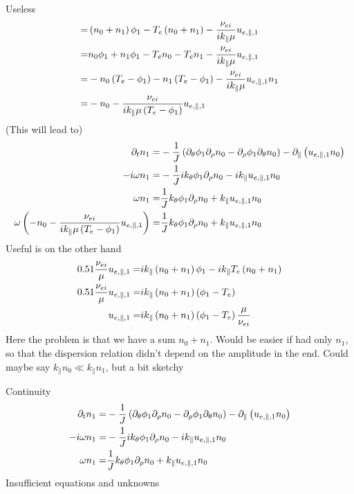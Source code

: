 Useless
%
\begin{align*}
=&
\left( n_0 + n_1\right) \phi_1
- T_e \left( n_0 + n_1 \right)
-  \frac{\nu_{ei}}{ik_\|\mu }  u_{e,\|,1}
  \\
=&
n_0 \phi_1+ n_1 \phi_1
- T_e  n_0 - T_e n_1
-  \frac{\nu_{ei}}{ik_\|\mu }  u_{e,\|,1}
  \\
=&
- n_0 \left(T_e - \phi_1\right)
- n_1 \left(T_e - \phi_1\right)
-  \frac{\nu_{ei}}{ik_\|\mu }  u_{e,\|,1}
  n_1
  \\
=&
- n_0
-  \frac{\nu_{ei}}{ik_\|\mu \left(T_e - \phi_1\right) }  u_{e,\|,1}
\end{align*}
%
(This will lead to)
%
\begin{align*}
 \partial_t n_1
=&
 -\frac{1}{J}\left(
  \partial_\theta\phi_1\partial_\rho n_0
 - \partial_\rho\phi_1\partial_\theta n_0
 \right)
 -  \partial_\| \left(u_{e,\|,1} n_0 \right)
 \\
 -i\omega n_1
=&
 -\frac{1}{J} ik_\theta\phi_1\partial_\rho n_0
 - ik_\|u_{e,\|,1} n_0
 \\
 \omega n_1
=&
 \frac{1}{J} k_\theta\phi_1\partial_\rho n_0
 + k_\|u_{e,\|,1} n_0
 \\
 \omega
 \left(
- n_0
-  \frac{\nu_{ei}}{ik_\|\mu \left(T_e - \phi_1\right) }  u_{e,\|,1}
 \right)
=&
 \frac{1}{J} k_\theta\phi_1\partial_\rho n_0
 + k_\|u_{e,\|,1} n_0
\end{align*}
%
Useful is on the other hand
%
\begin{align*}
    0.51 \frac{\nu_{ei}}{\mu }  u_{e,\|,1}
=&
ik_\|\L( n_0 + n_1\R) \phi_1
- ik_\|T_e \L( n_0 + n_1 \R)
\\
%
    0.51 \frac{\nu_{ei}}{\mu }  u_{e,\|,1}
=&
ik_\|\L( n_0 + n_1\R) \L(\phi_1 -T_e \R)
\\
%
     u_{e,\|,1}
=&
ik_\|\L( n_0 + n_1\R) \L(\phi_1 -T_e \R)
     \frac{\mu}{\nu_{ei} }
\end{align*}
%
Here the problem is that we have a sum $n_0 + n_1$.
Would be easier if had only $n_1$, so that the dispersion relation didn't depend on the amplitude in the end.
Could maybe say $k_\|n_0 \ll k_\|n_1$, but a bit sketchy

Continuity
%
\begin{align*}
 \partial_t n_1
=&
 -\frac{1}{J}\left(
  \partial_\theta\phi_1\partial_\rho n_0
 - \partial_\rho\phi_1\partial_\theta n_0
 \right)
 -  \partial_\| \left(u_{e,\|,1} n_0 \right)
 \\
 -i\omega n_1
=&
 -\frac{1}{J} ik_\theta\phi_1\partial_\rho n_0
 - ik_\|u_{e,\|,1} n_0
 \\
 \omega n_1
=&
 \frac{1}{J} k_\theta\phi_1\partial_\rho n_0
 + k_\|u_{e,\|,1} n_0
\end{align*}
%
Insufficient equations and unknowns
